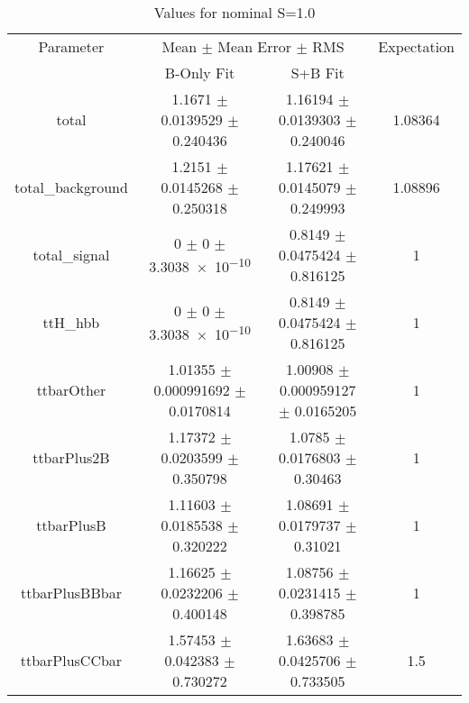 \begin{table}
\centering
\caption{Values for nominal S=1.0}
\begin{tabular}{cccc}
\toprule
Parameter & \multicolumn{2}{c}{Mean $\pm$ Mean Error $\pm$ RMS} & Expectation\\
 & B-Only Fit & S+B Fit & \\
\midrule
total & \num{1.1671} $\pm$ \num{0.0139529} $\pm$ \num{0.240436} & \num{1.16194} $\pm$ \num{0.0139303} $\pm$ \num{0.240046} & \num{1.08364}\\
total\_background & \num{1.2151} $\pm$ \num{0.0145268} $\pm$ \num{0.250318} & \num{1.17621} $\pm$ \num{0.0145079} $\pm$ \num{0.249993} & \num{1.08896}\\
total\_signal & \num{0} $\pm$ \num{0} $\pm$ \num{3.3038e-10} & \num{0.8149} $\pm$ \num{0.0475424} $\pm$ \num{0.816125} & \num{1}\\
ttH\_hbb & \num{0} $\pm$ \num{0} $\pm$ \num{3.3038e-10} & \num{0.8149} $\pm$ \num{0.0475424} $\pm$ \num{0.816125} & \num{1}\\
ttbarOther & \num{1.01355} $\pm$ \num{0.000991692} $\pm$ \num{0.0170814} & \num{1.00908} $\pm$ \num{0.000959127} $\pm$ \num{0.0165205} & \num{1}\\
ttbarPlus2B & \num{1.17372} $\pm$ \num{0.0203599} $\pm$ \num{0.350798} & \num{1.0785} $\pm$ \num{0.0176803} $\pm$ \num{0.30463} & \num{1}\\
ttbarPlusB & \num{1.11603} $\pm$ \num{0.0185538} $\pm$ \num{0.320222} & \num{1.08691} $\pm$ \num{0.0179737} $\pm$ \num{0.31021} & \num{1}\\
ttbarPlusBBbar & \num{1.16625} $\pm$ \num{0.0232206} $\pm$ \num{0.400148} & \num{1.08756} $\pm$ \num{0.0231415} $\pm$ \num{0.398785} & \num{1}\\
ttbarPlusCCbar & \num{1.57453} $\pm$ \num{0.042383} $\pm$ \num{0.730272} & \num{1.63683} $\pm$ \num{0.0425706} $\pm$ \num{0.733505} & \num{1.5}\\
\bottomrule
\end{tabular}
\end{table}